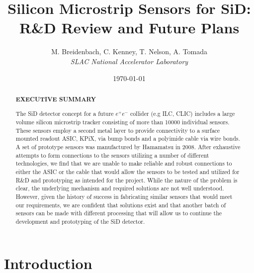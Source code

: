 \documentclass[prc,12pt,nofootinbib,letterpaper]{revtex4}
\begin{document}
\title{\bf{\Large Silicon Microstrip Sensors for SiD:} \\  R\&D Review and Future Plans}

\author{M. Breidenbach, C. Kenney, T. Nelson, A. Tomada \\ \textit{SLAC National Accelerator Laboratory}}

%

\date{\today}

\begin{abstract}
\vspace{0.5cm}

\begin{centerline}
{\bf {EXECUTIVE SUMMARY}}
\end{centerline}
\begin{singlespace}

The SiD detector concept for a future $e^+e^-$ collider (e.g ILC, CLIC) includes a large volume silicon microstrip tracker consisting of more than 10000 individual sensors.  These sensors employ a second metal layer to provide connectivity to a surface mounted readout ASIC, KPiX, via bump bonds and a polyimide cable via wire bonds. A set of prototype sensors was manufactured by Hamamatsu in 2008. After exhaustive attempts to form connections to the sensors utilizing a number of different technologies, we find that we are unable to make reliable and robust connections to either the ASIC or the cable that would allow the sensors to be tested and utilized for R\&D and prototyping as intended for the project. While the nature of the problem is clear, the underlying mechanism and required solutions are not well understood.  However, given the history of success in fabricating similar sensors that would meet our requirements, we are confident that solutions exist and that another batch of sensors can be made with different processing that will allow us to continue the development and prototyping of the SiD detector.

\end{singlespace}
\end{abstract}

\maketitle

\section{Introduction}
\end{document}
